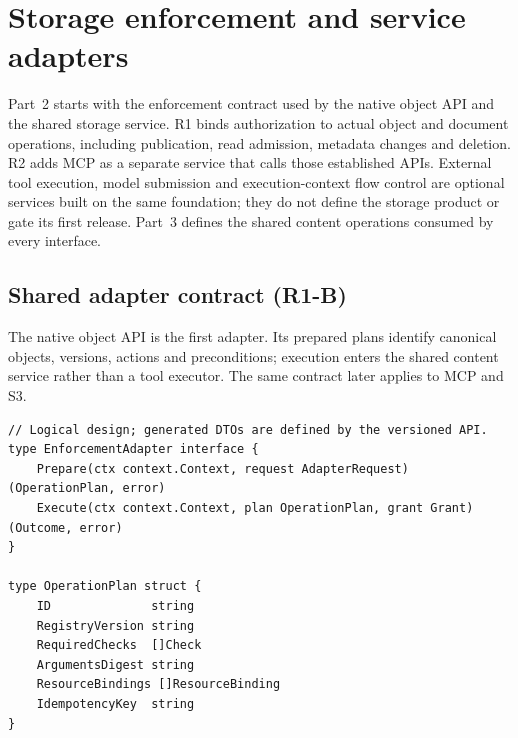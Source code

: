 \section{Storage enforcement and service adapters}\label{sec:enforcement}
Part~2 starts with the enforcement contract used by the native object API and the shared storage service. R1 binds authorization to actual object and document operations, including publication, read admission, metadata changes and deletion. R2 adds MCP as a separate service that calls those established APIs. External tool execution, model submission and execution-context flow control are optional services built on the same foundation; they do not define the storage product or gate its first release. Part~3 defines the shared content operations consumed by every interface.

\subsection{Shared adapter contract (R1-B)}
The native object API is the first adapter. Its prepared plans identify canonical objects, versions, actions and preconditions; execution enters the shared content service rather than a tool executor. The same contract later applies to MCP and S3.
\begin{lstlisting}
// Logical design; generated DTOs are defined by the versioned API.
type EnforcementAdapter interface {
    Prepare(ctx context.Context, request AdapterRequest) (OperationPlan, error)
    Execute(ctx context.Context, plan OperationPlan, grant Grant) (Outcome, error)
}

type OperationPlan struct {
    ID              string
    RegistryVersion string
    RequiredChecks  []Check
    ArgumentsDigest string
    ResourceBindings []ResourceBinding
    IdempotencyKey  string
}
\end{lstlisting}
